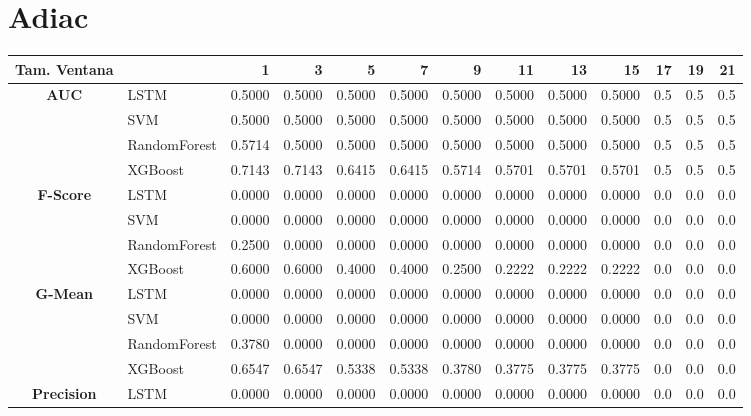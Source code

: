\section{Adiac}
\begin{table}[h]
	\centering
	\begin{adjustbox}{max width=15cm}
		\begin{tabular}{|c|l|r|r|r|r|r|r|r|r|r|r|r|}
			\hline
			\textbf{Tam. Ventana}&         &      1  &      3  &      5  &      7  &      9  &      11 &      13 &      15 &   17 &   19 &   21 \\
			\hline
			\textbf{AUC} & LSTM &  0.5000 &  0.5000 &  0.5000 &  0.5000 &  0.5000 &  0.5000 &  0.5000 &  0.5000 &  0.5 &  0.5 &  0.5 \\
			& SVM &  0.5000 &  0.5000 &  0.5000 &  0.5000 &  0.5000 &  0.5000 &  0.5000 &  0.5000 &  0.5 &  0.5 &  0.5 \\
			& RandomForest &  0.5714 &  0.5000 &  0.5000 &  0.5000 &  0.5000 &  0.5000 &  0.5000 &  0.5000 &  0.5 &  0.5 &  0.5 \\
			& XGBoost &  0.7143 &  0.7143 &  0.6415 &  0.6415 &  0.5714 &  0.5701 &  0.5701 &  0.5701 &  0.5 &  0.5 &  0.5 \\
			\hline
			\textbf{F-Score} & LSTM &  0.0000 &  0.0000 &  0.0000 &  0.0000 &  0.0000 &  0.0000 &  0.0000 &  0.0000 &  0.0 &  0.0 &  0.0 \\
			& SVM &  0.0000 &  0.0000 &  0.0000 &  0.0000 &  0.0000 &  0.0000 &  0.0000 &  0.0000 &  0.0 &  0.0 &  0.0 \\
			& RandomForest &  0.2500 &  0.0000 &  0.0000 &  0.0000 &  0.0000 &  0.0000 &  0.0000 &  0.0000 &  0.0 &  0.0 &  0.0 \\
			& XGBoost &  0.6000 &  0.6000 &  0.4000 &  0.4000 &  0.2500 &  0.2222 &  0.2222 &  0.2222 &  0.0 &  0.0 &  0.0 \\
			\hline
			\textbf{G-Mean} & LSTM &  0.0000 &  0.0000 &  0.0000 &  0.0000 &  0.0000 &  0.0000 &  0.0000 &  0.0000 &  0.0 &  0.0 &  0.0 \\
			& SVM &  0.0000 &  0.0000 &  0.0000 &  0.0000 &  0.0000 &  0.0000 &  0.0000 &  0.0000 &  0.0 &  0.0 &  0.0 \\
			& RandomForest &  0.3780 &  0.0000 &  0.0000 &  0.0000 &  0.0000 &  0.0000 &  0.0000 &  0.0000 &  0.0 &  0.0 &  0.0 \\
			& XGBoost &  0.6547 &  0.6547 &  0.5338 &  0.5338 &  0.3780 &  0.3775 &  0.3775 &  0.3775 &  0.0 &  0.0 &  0.0 \\
			\hline
			\textbf{Precision} & LSTM &  0.0000 &  0.0000 &  0.0000 &  0.0000 &  0.0000 &  0.0000 &  0.0000 &  0.0000 &  0.0 &  0.0 &  0.0 \\

\end{tabular}
\end{adjustbox}
\end{table}
